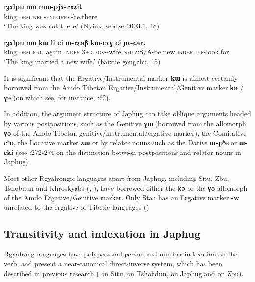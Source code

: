 \documentclass[oneside,a4paper,11pt]{article}
\newcommand{\ipa}[1]{{\phon\textbf{\mbox{#1}}}} %
\begin{document}
 \begin{exe}
\ex \label{ex:abs}
\gll
\ipa{rɟɤlpu}  	\ipa{nɯ}  	\ipa{mɯ-pjɤ-rɤʑit}  \\
king \textsc{dem} \textsc{neg-evd.ipfv}-be.there \\
 \glt `The king was not there.' (Nyima wodzer2003.1, 18)
\end{exe}

 \begin{exe}
\ex \label{ex:erg}
\gll 
\ipa{rɟɤlpu}  	\ipa{nɯ}  	\ipa{kɯ}  	\ipa{li}  	\ipa{ci}  	\ipa{ɯ-rʑaβ}  	\ipa{kɯ-ɕɤɣ}  	\ipa{ci}  	\ipa{ɲɤ-ɕar.}  	 \\
king \textsc{dem} \textsc{erg} again \textsc{indef} \textsc{3sg.poss}-wife \textsc{nmlz}:S/A-be.new \textsc{indef}  \textsc{ifr}-look.for \\
\glt `The king married a new wife.' (baixue gongzhu, 15)
\end{exe}

It is significant that the Ergative/Instrumental marker \ipa{kɯ} is almost certainly borrowed from the Amdo Tibetan Ergative/Instrumental/Genitive marker \ipa{kə} / \ipa{ɣə} (on which see, for instance, \citealt{haller04themchen}:62).

In addition, the argument structure of Japhug can take oblique arguments headed by various postpositions, such as the Genitive \ipa{ɣɯ} (borrowed from the allomorph \ipa{ɣə} of the Amdo Tibetan genitive/instrumental/ergative marker), the Comitative \ipa{cʰo}, the Locative marker \ipa{zɯ} or by relator nouns such as the Dative  \ipa{ɯ-pʰe} or \ipa{ɯ-ɕki} (see \citealt{jacques14linking}:272-274 on the distinction between postpositions and relator nouns in Japhug).

Most other Rgyalrongic languages apart from Japhug, including Situ, Zbu, Tshobdun and Khroskyabs (\citealt{jackson98morphology}, \citealt{lai13affixale}), have borrowed either the \ipa{kə} or the \ipa{ɣə} allomorph of the Amdo  Ergative/Genitive marker. Only Stau has an Ergative marker \ipa{-w} unrelated to the ergative of Tibetic languages (\citealt{jacques14rtau})

\subsection{Transitivity and indexation in Japhug}
Rgyalrong languages have polypersonal person and number indexation on the verb, and present a near-canonical direct-inverse system, which has been described in previous research (\citealt{delancey81direction} on Situ,  \citealt{jackson02rentongdengdi} on Tshobdun,  \citealt{jacques10inverse} on Japhug and \citealt{gongxun14agreement} on Zbu). 
\end{document}
